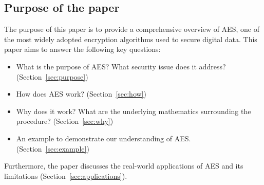 \subsection{Purpose of the paper}

The purpose of this paper is to provide a comprehensive overview of \gls{AES}, one of the most widely adopted encryption algorithms used to secure digital data.
This paper aims to answer the following key questions:
\begin{itemize}
    \item What is the purpose of \gls{AES}? What security issue does it address? (Section~\ref{sec:purpose})
    \item How does \gls{AES} work? (Section~\ref{sec:how})
    \item Why does it work? What are the underlying mathematics surrounding the procedure?  (Section~\ref{sec:why})
    \item An example to demonstrate our understanding of \gls{AES}. (Section~\ref{sec:example})
\end{itemize}
Furthermore, the paper discusses the real-world applications of \gls{AES} and its limitations (Section~\ref{sec:applications}). 

